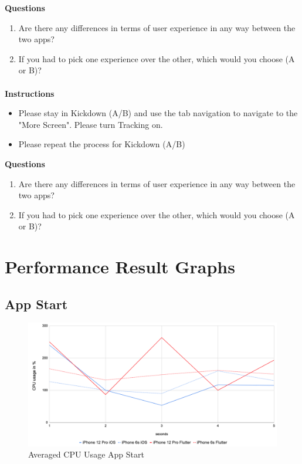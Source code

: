 \textbf{Questions}
\begin{enumerate}
    \item Are there any differences in terms of user experience in any way between the two apps?
    \item If you had to pick one experience over the other, which would you choose (A or B)?
\end{enumerate}

\paragraph*{    }\hfill \break
\textbf{Instructions}
\begin{itemize}
    \item Please stay in Kickdown (A/B) and use the tab navigation to navigate to the "More Screen". Please turn Tracking on.
    \item Please repeat the process for Kickdown (A/B)
\end{itemize}

\textbf{Questions}
\begin{enumerate}
    \item Are there any differences in terms of user experience in any way between the two apps?
    \item If you had to pick one experience over the other, which would you choose (A or B)?
\end{enumerate}


\section{Performance Result Graphs}

\subsection{App Start}

\begin{figure}
    \centering
    \includegraphics[width=\linewidth]{images/performance_results/app_start/avg_cpu_usage_app_start.png}
    \caption{Averaged CPU Usage App Start}
    \label{fig:avg_cpu_usage_app_start}
\end{figure}

